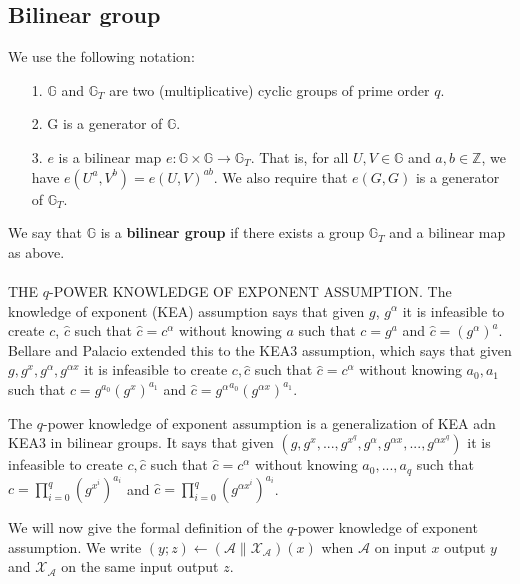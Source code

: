 \documentclass[lnbip]{svmultln}
\begin{document}
\subsection{Bilinear group}
We use the following notation\cite{boneh2005evaluating}:
\begin{itemize}
	\item[1.] $\mathbb{G}$ and $\mathbb{G}_T$ are two (multiplicative) cyclic groups of prime order $q$.
	\item[2.] G is a generator of $\mathbb{G}$.
	\item[3.] $e$ is a bilinear map $e:\mathbb{G} \times \mathbb{G} \rightarrow \mathbb{G}_T$. That is, for all $U,V \in \mathbb{G}$ and $a,b \in \mathbb{Z}$, we have $e(U^a,V^b)=e(U,V)^{ab}.$ We also require that $e(G,G)$ is a generator of $\mathbb{G}_T$.
\end{itemize}

We say that $\mathbb{G}$ is a \textbf{bilinear group} if there exists a group $\mathbb{G}_T$ and a bilinear
map as above.\\ \\
THE $q$-POWER KNOWLEDGE OF EXPONENT ASSUMPTION. The knowledge of exponent (KEA) assumption\cite{damgaard1991towards} says that given $g$, $g^\alpha$ it is infeasible to create $c$, $\hat{c}$ such that $\hat{c}=c^\alpha$ without knowing $a$ such that $c=g^a$ and $\hat{c}=(g^\alpha)^a$. Bellare and Palacio\cite{bellare2004towards} extended this to the KEA3 assumption, which says that given $g,g^x,g^\alpha,g^{\alpha x}$ it is infeasible to create $c,\hat{c}$ such that $\hat{c}=c^\alpha$ without knowing $a_0,a_1$ such that $c=g^{a_0}(g^x)^{a_1}$ and $\hat{c}={g^\alpha}^{a_0}(g^{\alpha x})^{a_1}$.

The $q$-power knowledge of exponent assumption is a generalization of KEA adn KEA3 in bilinear groups. It says that given $(g,g^x,...,g^{x^q},g^\alpha,g^{\alpha x},...,g^{\alpha x^q})$ it is infeasible to create $c,\hat{c}$ such that $\hat{c}=c^\alpha$ without knowing $a_0,...,a_q$ such that $c=\prod_{i=0}^{q}(g^{x^i})^{a_i}$ and $\hat{c}=\prod_{i=0}^{q}(g^{\alpha{x^i}})^{a_i}$.

We will now give the formal definition of the $q$-power knowledge of exponent assumption. We write $(y;z)\leftarrow (\mathcal{A}\parallel\mathcal{X}_\mathcal{A})(x)$ when $\mathcal{A}$ on input $x$ output $y$ and $\mathcal{X}_\mathcal{A}$ on the same input output $z$.
\end{document}
